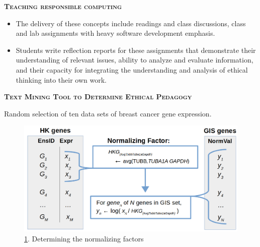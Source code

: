 \documentclass[final,t]{beamer}
\begin{document}
\begin{frame}{}
\begin{columns}
\begin{column}{.5\linewidth}
\begin{block}{\textsc{\textbf{Teaching responsible computing}}}
\begin{itemize}
					\item The delivery of these concepts include readings and class discussions, class and lab assignments with heavy software development emphasis. 
					\item Students  write reflection reports for these assignments that demonstrate their understanding of relevant issues,  ability to analyze and evaluate information, and their capacity for integrating the understanding and analysis of ethical thinking into their own work.
				\end{itemize}
				\vspace*{3mm}
			\end{block}
%
%



			\begin{block}{\textsc{\textbf{Text Mining Tool to Determine Ethical Pedagogy}}}
			\begin{center}

 Random selection of ten data sets of breast cancer gene expression. 
				\begin{figure}
					\includegraphics[scale = 0.60]{graphics/normFactor.png}
					\caption{\ref{fig:normFactor}. Determining the normalizing factors}
					\label{fig:normFactor}
				\end{figure}
				
				\begin{center}\end{center} %
				

\end{center}
\end{block}
\end{column}
\end{columns}
\end{frame}
\end{document}
